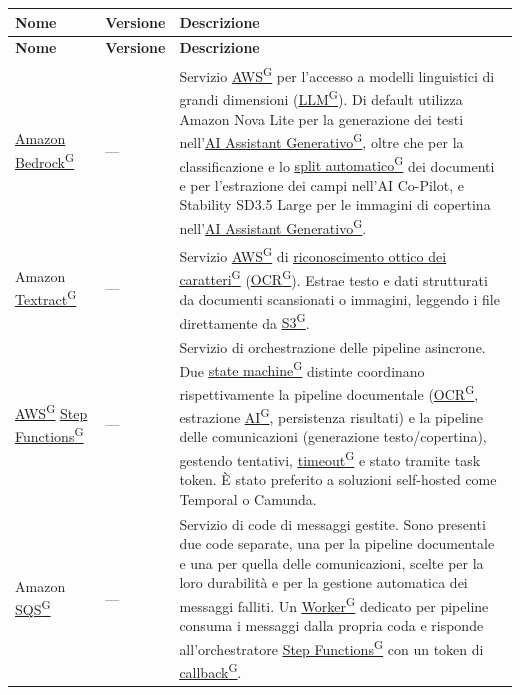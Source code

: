 \documentclass[a4paper,12pt]{article}
\providecommand{\glslink}[2]{\href{https://alittlebyte-19.github.io/Documentazione/glossario.html\#gls-#1}{\underline{#2}\textsuperscript{\scriptsize G}}}
\begin{document}
\renewcommand{\arraystretch}{1.3}
{\small
\setlength{\LTleft}{0pt}
\setlength{\LTright}{0pt}
\begin{longtable}{|p{3.5cm}|p{1.8cm}|p{9.2cm}|}
    \hline
    \rowcolor{gray!20}
    \textbf{Nome} & \textbf{Versione} & \textbf{Descrizione} \\
    \hline
    \endfirsthead
    \hline
    \rowcolor{gray!20}
    \textbf{Nome} & \textbf{Versione} & \textbf{Descrizione} \\
    \hline
    \endhead
    \glslink{amazon-bedrock}{Amazon Bedrock} & --- & Servizio \glslink{aws}{AWS} per l'accesso a modelli linguistici di grandi dimensioni (\glslink{llm-large-language-model}{LLM}). Di default utilizza Amazon Nova Lite per la generazione dei testi nell'\glslink{ai-assistant-generativo-ai-assistant}{AI Assistant Generativo}, oltre che per la classificazione e lo \glslink{split-automatico}{split automatico} dei documenti e per l'estrazione dei campi nell'AI Co-Pilot, e Stability SD3.5 Large per le immagini di copertina nell'\glslink{ai-assistant-generativo-ai-assistant}{AI Assistant Generativo}. \\
    \hline
    Amazon \glslink{textract}{Textract} & --- & Servizio \glslink{aws}{AWS} di \glslink{ocr-riconoscimento-ottico-dei-caratteri}{riconoscimento ottico dei caratteri} (\glslink{ocr-riconoscimento-ottico-dei-caratteri}{OCR}). Estrae testo e dati strutturati da documenti scansionati o immagini, leggendo i file direttamente da \glslink{s3-simple-storage-service}{S3}. \\
    \hline
    \glslink{aws}{AWS} \glslink{step-functions}{Step Functions} & --- & Servizio di orchestrazione delle pipeline asincrone. Due \glslink{state-machine}{state machine} distinte coordinano rispettivamente la pipeline documentale (\glslink{ocr-riconoscimento-ottico-dei-caratteri}{OCR}, estrazione \glslink{intelligenza-artificiale-ai}{AI}, persistenza risultati) e la pipeline delle comunicazioni (generazione testo/copertina), gestendo tentativi, \glslink{timeout}{timeout} e stato tramite task token. È stato preferito a soluzioni self-hosted come Temporal o Camunda. \\
    \hline
    Amazon \glslink{sqs-simple-queue-service}{SQS} & --- & Servizio di code di messaggi gestite. Sono presenti due code separate, una per la pipeline documentale e una per quella delle comunicazioni, scelte per la loro durabilità e per la gestione automatica dei messaggi falliti. Un \glslink{worker}{Worker} dedicato per pipeline consuma i messaggi dalla propria coda e risponde all'orchestratore \glslink{step-functions}{Step Functions} con un token di \glslink{callback}{callback}. \\

\end{longtable}}
\end{document}
